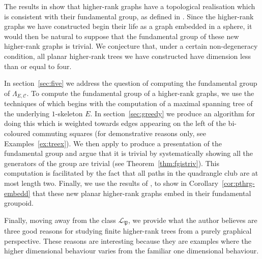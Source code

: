 \documentclass[12pt]{amsart}
\theoremstyle{definition}
\theoremstyle{remark}
\numberwithin{equation}{section}
\begin{document}
The results in \cite{KKQS} show that higher-rank graphs have a topological realisation which is consistent with their fundamental group, as defined in \cite{PQR1}. Since the higher-rank graphs we have constructed begin their life as a graph embedded in a sphere, it would then be natural to suppose that the fundamental group of these new higher-rank graphs is trivial. We conjecture that, under a certain non-degeneracy condition, all planar higher-rank trees we have constructed have dimension less than or equal to four.

In section~\ref{sec:five} we address the question of computing the fundamental group of $\Lambda_{E,\mathcal{C}}$. To compute the fundamental group of a higher-rank graphs, we use the techniques of \cite{KPW} which begins with the computation of a maximal spanning tree of the underlying $1$-skeleton $E$. In section~\ref{sec:greedy} we produce an algorithm for doing this which is weighted towards edges appearing on the left of the bi-coloured commuting squares (for demonstrative reasons only, see Examples~\ref{ex:treex}). We then apply \cite[Theorem 5.1]{KPW} to produce a presentation of the fundamental group and argue that it is trivial by systematically showing all the generators of the group are trivial (see Theorem~\ref{thm:fgistriv}). This computation is facilitated by the fact that all paths in the quadrangle club are at most length two. Finally, we use the results of \cite{bkps}, to show in Corollary~\ref{cor:pthrg-embedd} that these new planar higher-rank graphs embed in their fundamental groupoid.


Finally, moving away from the class $\mathcal{L}_{\mathfrak{P}}$, we provide what the author believes  are three good reasons for
studying finite higher-rank trees from a purely graphical perspective. These reasons are interesting because they are examples where the higher dimensional behaviour varies from the familiar one dimensional behaviour. 
\end{document}
